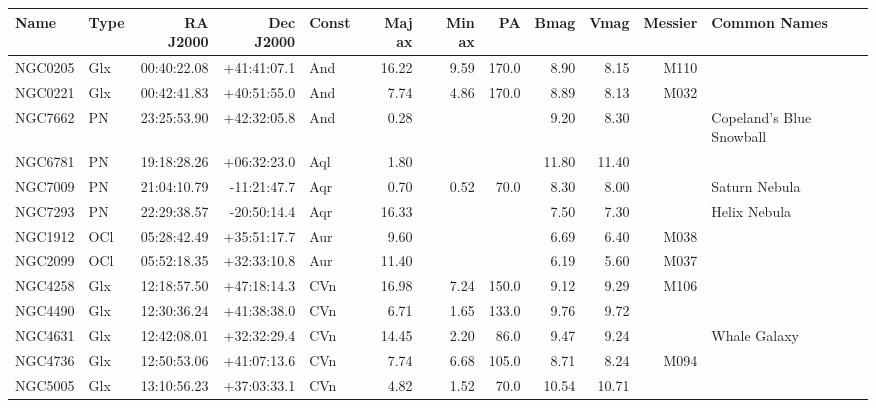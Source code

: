 \documentclass[11pt]{article}
\begin{document}
\begin{longtable}{llrrlrrrrrrl}
  \toprule
  Name    & Type    & RA J2000    & Dec J2000   & Const & Maj ax & Min ax & PA    & Bmag  & Vmag  & Messier & Common Names                   \\
  \midrule \endhead
  NGC0205 & Glx     & 00:40:22.08 & +41:41:07.1 & And   & 16.22  & 9.59   & 170.0 & 8.90  & 8.15  & M110    &                                \\
  NGC0221 & Glx     & 00:42:41.83 & +40:51:55.0 & And   & 7.74   & 4.86   & 170.0 & 8.89  & 8.13  & M032    &                                \\
  NGC7662 & PN      & 23:25:53.90 & +42:32:05.8 & And   & 0.28   &        &       & 9.20  & 8.30  &         & Copeland's Blue Snowball       \\
  NGC6781 & PN      & 19:18:28.26 & +06:32:23.0 & Aql   & 1.80   &        &       & 11.80 & 11.40 &         &                                \\
  NGC7009 & PN      & 21:04:10.79 & -11:21:47.7 & Aqr   & 0.70   & 0.52   & 70.0  & 8.30  & 8.00  &         & Saturn Nebula                  \\
  NGC7293 & PN      & 22:29:38.57 & -20:50:14.4 & Aqr   & 16.33  &        &       & 7.50  & 7.30  &         & Helix Nebula                   \\
  NGC1912 & OCl     & 05:28:42.49 & +35:51:17.7 & Aur   & 9.60   &        &       & 6.69  & 6.40  & M038    &                                \\
  NGC2099 & OCl     & 05:52:18.35 & +32:33:10.8 & Aur   & 11.40  &        &       & 6.19  & 5.60  & M037    &                                \\
  NGC4258 & Glx     & 12:18:57.50 & +47:18:14.3 & CVn   & 16.98  & 7.24   & 150.0 & 9.12  & 9.29  & M106    &                                \\
  NGC4490 & Glx     & 12:30:36.24 & +41:38:38.0 & CVn   & 6.71   & 1.65   & 133.0 & 9.76  & 9.72  &         &                                \\
  NGC4631 & Glx     & 12:42:08.01 & +32:32:29.4 & CVn   & 14.45  & 2.20   & 86.0  & 9.47  & 9.24  &         & Whale Galaxy                   \\
  NGC4736 & Glx     & 12:50:53.06 & +41:07:13.6 & CVn   & 7.74   & 6.68   & 105.0 & 8.71  & 8.24  & M094    &                                \\
  NGC5005 & Glx     & 13:10:56.23 & +37:03:33.1 & CVn   & 4.82   & 1.52   & 70.0  & 10.54 & 10.71 &         &                                \\

\end{longtable}
\end{document}
